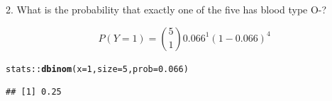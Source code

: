 \documentclass[10pt]{beamer}\usepackage[]{graphicx}\usepackage[]{color}
\makeatletter
\newcommand{\hlnum}[1]{\textcolor[rgb]{0.686,0.059,0.569}{#1}}%
\newcommand{\hlopt}[1]{\textcolor[rgb]{0,0,0}{#1}}%
\newcommand{\hlstd}[1]{\textcolor[rgb]{0.345,0.345,0.345}{#1}}%
\newcommand{\hlkwc}[1]{\textcolor[rgb]{0.333,0.667,0.333}{#1}}%
\newcommand{\hlkwd}[1]{\textcolor[rgb]{0.737,0.353,0.396}{\textbf{#1}}}%
\newenvironment{kframe}{%
 \def\at@end@of@kframe{}%
 \ifinner\ifhmode%
  \def\at@end@of@kframe{\end{minipage}}%
  \begin{minipage}{\columnwidth}%
 \fi\fi%
 \def\FrameCommand##1{\hskip\@totalleftmargin \hskip-\fboxsep
 \colorbox{shadecolor}{##1}\hskip-\fboxsep
     \hskip-\linewidth \hskip-\@totalleftmargin \hskip\columnwidth}%
 \MakeFramed {\advance\hsize-\width
   \@totalleftmargin\z@ \linewidth\hsize
   \@setminipage}}%
 {\par\unskip\endMakeFramed%
 \at@end@of@kframe}
\newenvironment{knitrout}{}{} %
\makeatother
\begin{document}
\begin{frame}[fragile]{2. What is the probability that exactly one of the five has blood type O-?}
	
	$$ 
	P(Y = 1) = \binom{5}{1} 0.066^1 (1- 0.066)^4
	$$
	
	
\begin{knitrout}\tiny
{}\color{fgcolor}\begin{kframe}
\begin{alltt}
\hlstd{stats}\hlopt{::}\hlkwd{dbinom}\hlstd{(}\hlkwc{x} \hlstd{=} \hlnum{1}\hlstd{,} \hlkwc{size} \hlstd{=} \hlnum{5}\hlstd{,} \hlkwc{prob} \hlstd{=} \hlnum{0.066}\hlstd{)}
\end{alltt}
\begin{verbatim}
## [1] 0.25
\end{verbatim}
\end{kframe}
\end{knitrout}
	
\end{frame}
\end{document}
